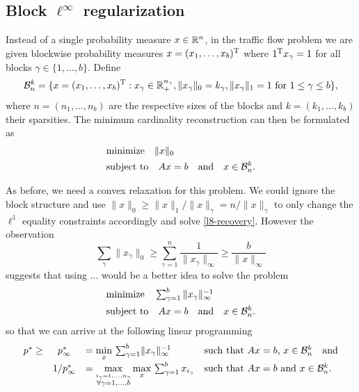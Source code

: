 \documentclass{article} %
\begin{document}
\subsection{Block $\ell^\infty$ regularization}

Instead of a single probability measure $x\in \mathbb{R}^n$, in the traffic
flow problem we are given blockwise probability measures $x = (x_1,
\dots, x_b)^{\rm T}$ where $1^{\rm T} x_\gamma = 1$ for all blocks $\gamma\in
\{1, \dots, b\}$. Define
\begin{equation*}
  \mathcal B_n^k = \{x = (x_1, \dots, x_b)^{\rm T} : x_\gamma \in \mathbb{R}_+^{n_\gamma}, \lVert x_\gamma\rVert_0 = k_\gamma, \lVert x_\gamma\rVert_1 = 1\text{ for $1\leq \gamma\leq b$}\},
\end{equation*}
where $n = (n_1, \dots, n_b)$ are the respective sizes of the blocks
and $k = (k_1, \dots, k_b)$ their sparsities. The minimum cardinality
reconstruction can then be formulated as
\begin{equation}
  \begin{split}
    &\text{minimize}\quad \lVert x\rVert_0\\
    &\text{subject to}\quad Ax = b\quad\text{and}\quad x\in \mathcal B_n^k.
  \end{split}
\end{equation}

As before, we need a convex relaxation for this problem. We could ignore the block structure and use $\|x\|_0 \geq \|x\|_1/ \|x\|_{\gamma} = n/ \|x\|_{\gamma}$ to only change the $\ell^1$ equality constraints accordingly and solve \eqref{l8-recovery}. However the observation
\begin{equation*}
\sum_{\gamma}\|x_{\gamma}\|_0 \geq \sum_{\gamma=1}^n\frac{1}{\|x_{\gamma}\|_{\infty}} \geq \frac{b}{\|x\|_{\infty}}
\end{equation*}
suggests that using ... would be a better idea to solve the problem
\begin{equation}
\label{block-relaxation}
  \begin{split}
    &\text{minimize}\quad \textstyle\sum_{\gamma=1}^b {\lVert x_\gamma\rVert_\infty^{-1}}\\
    &\text{subject to}\quad Ax = b\quad\text{and}\quad x\in \mathcal B_n^k.
  \end{split}
\end{equation}
so that we can arrive at the following linear programming
\begin{equation}\label{block-l8-recovery}
  \begin{array}{rcllllr}
  p^* \geq& p_\infty^* &= \min\limits_x\, \sum_{\gamma = 1}^b\lVert x_{\gamma}\rVert_\infty^{-1}&\text{such that $Ax = b$, $x\in \mathcal B_n^k$}\quad \text{and}\\[5pt]
  &1/p_\infty^* &= \max\limits_{\overset{i_{\gamma} = 1, \dots, n_{\gamma}}{\forall \gamma = 1,\dots, b}} \max\limits_{x}\, \sum_{\gamma=1}^b x_{i_\gamma}&\text{such that $Ax = b$ and $x\in \mathcal B_n^k$.}
  \end{array}
\end{equation} 
\end{document}
